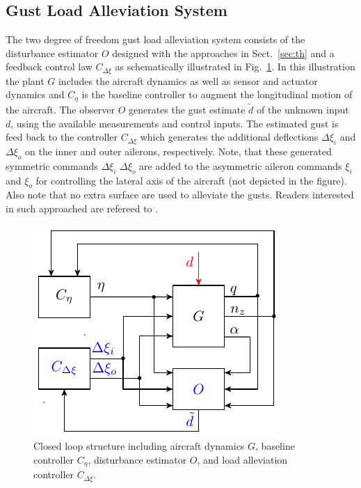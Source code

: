 \documentclass[graybox]{svmult}
\begin{document}
\subsection{Gust Load Alleviation System}\label{APPsubsec:sys}\vspace{-1mm}
The two degree of freedom gust load alleviation system consists of the disturbance estimator $O$ designed with the approaches in Sect.~\ref{sec:th} and a feedback control law $C_{\Delta\xi}$ as schematically illustrated in Fig.~\ref{fig:cl}. In this illustration the plant $G$   includes the aircraft dynamics as well as sensor and actuator dynamics and $C_\eta$ is the baseline controller to augment the longitudinal motion of the aircraft.
The observer $O$ generates the gust estimate $\tilde d$ of the unknown input $d$, using the available measurements and control inputs. The estimated gust is feed back to the controller $C_{\Delta\xi}$ which generates the additional  deflections  $\Delta \xi_i$  and $\Delta \xi_o$ on the inner and outer ailerons, respectively. Note, that these generated symmetric commands $\Delta \xi_i$ $\Delta \xi_o$ are added to the asymmetric aileron commands  $\xi_i$  and $ \xi_o$ for controlling the lateral axis of the aircraft (not depicted in the figure). Also note that no extra surface are used to alleviate the gusts. Readers interested in such approached are refereed to  \cite{Pusch2015, Pusch2017}. 
 

\begin{figure}[t]
	\sidecaption[]
	\includegraphics{closedloop.pdf}
	\caption{Closed loop structure including aircraft dynamics $G$, baseline controller $C_\eta$, disturbance estimator $O$, and  load alleviation controller $C_{\Delta \xi}$. }
	\label{fig:cl}	
	\vspace{-2.5mm}
\end{figure}
\end{document}
